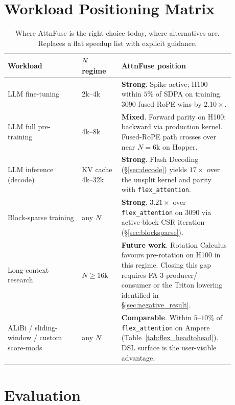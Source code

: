 \documentclass[10pt,twocolumn]{article}
\begin{document}
\section{Workload Positioning Matrix}
\label{sec:positioning}

\begin{table}[H]
\centering\small
\renewcommand{\arraystretch}{1.15}
\begin{tabular}{p{0.30\linewidth}p{0.16\linewidth}p{0.42\linewidth}}
\toprule
\textbf{Workload} & \textbf{$N$ regime} & \textbf{AttnFuse position} \\
\midrule
LLM fine-tuning & 2k--4k &
\textbf{Strong}. Spike active; H100 within $5\%$ of SDPA on training.
3090 fused RoPE wins by $2.10\times$. \\
LLM full pre-training & 4k--8k &
\textbf{Mixed}. Forward parity on H100; backward via production
kernel. Fused-RoPE path crosses over near $N{=}6$k on Hopper. \\
LLM inference (decode) & KV cache 4k--32k &
\textbf{Strong}. Flash Decoding (\S\ref{sec:decode}) yields
$17\times$ over the unsplit kernel and parity with
\texttt{flex\_attention}. \\
Block-sparse training & any $N$ &
\textbf{Strong}. $3.21\times$ over \texttt{flex\_attention} on
3090 via active-block CSR iteration (\S\ref{sec:blocksparse}). \\
Long-context research & $N \geq 16$k &
\textbf{Future work}. Rotation Calculus favours pre-rotation on
H100 in this regime. Closing this gap requires FA-3 producer/
consumer or the Triton lowering identified in
\S\ref{sec:negative_result}. \\
ALiBi / sliding-window / custom score-mods &
any $N$ &
\textbf{Comparable}. Within $5$--$10\%$ of
\texttt{flex\_attention} on Ampere
(Table~\ref{tab:flex_headtohead}). DSL surface is the user-visible
advantage. \\
\bottomrule
\end{tabular}
\caption{Where AttnFuse is the right choice today, where alternatives
are. Replaces a flat speedup list with explicit guidance.}
\label{tab:positioning}
\end{table}

\section{Evaluation}
\label{sec:eval}
\end{document}
